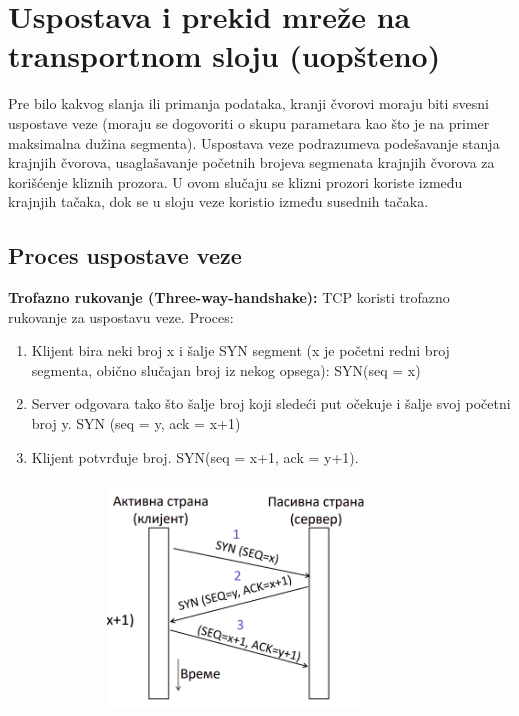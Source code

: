 \documentclass[a4paper]{article}
\begin{document}
\section{Uspostava i prekid mreže na transportnom sloju (uopšteno)}
    Pre bilo kakvog slanja ili primanja podataka, kranji čvorovi moraju biti svesni uspostave 
    veze (moraju se dogovoriti o skupu parametara kao što je na primer maksimalna dužina segmenta).
    Uspostava veze podrazumeva podešavanje stanja krajnjih čvorova, usaglašavanje početnih
    brojeva segmenata krajnjih čvorova za korišćenje kliznih prozora. U ovom slučaju se
    klizni prozori koriste između krajnjih tačaka, dok se u sloju veze koristio između 
    susednih tačaka. 

    \subsection{Proces uspostave veze}
        \textbf{Trofazno rukovanje (Three-way-handshake):} TCP koristi trofazno rukovanje za 
        uspostavu veze. Proces:
        \begin{enumerate}
            \item Klijent bira neki broj x i šalje SYN segment (x je početni redni 
                  broj segmenta, obično slučajan broj iz nekog opsega): SYN(seq = x)
            \item Server odgovara tako što šalje broj koji sledeći put očekuje i šalje 
                  svoj početni broj y. SYN (seq = y, ack = x+1)
            \item Klijent potvrđuje broj. SYN(seq = x+1, ack = y+1).
        \end{enumerate}
        \begin{figure}[H]
            \begin{center}
                \includegraphics[width=100mm,height=60mm]{Slike/uspostava_konekcije1.png}
            \end{center}
        \end{figure}
        
\end{document}
